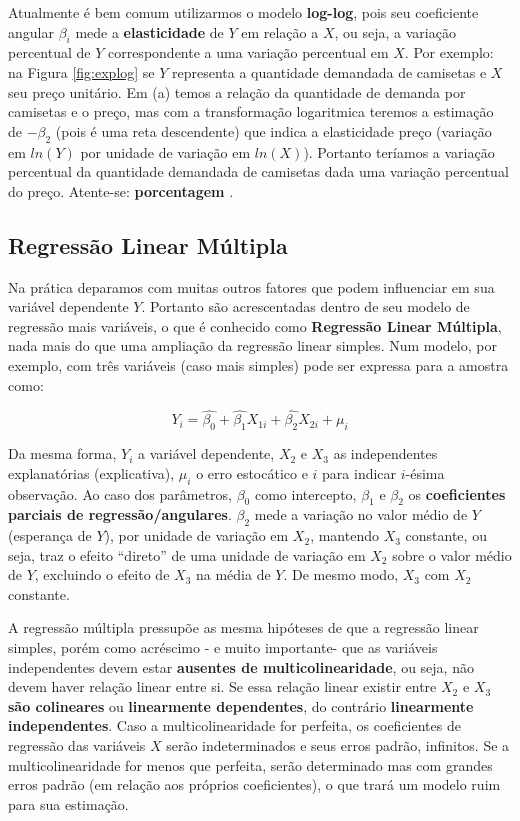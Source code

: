 \documentclass[
]{book}
\begin{document}
Atualmente é bem comum utilizarmos o modelo \textbf{log-log}, pois seu coeficiente angular \(\beta_i\) mede a \textbf{elasticidade} de \(Y\) em relação a \(X\), ou seja, a variação percentual de \(Y\) correspondente a uma variação percentual em \(X\). Por exemplo: na Figura \ref{fig:explog} se \(Y\) representa a quantidade demandada de camisetas e \(X\) seu preço unitário. Em (a) temos a relação da quantidade de demanda por camisetas e o preço, mas com a transformação logaritmica teremos a estimação de \(-\beta_2\) (pois é uma reta descendente) que indica a elasticidade preço (variação em \(ln(Y)\) por unidade de variação em \(ln(X)\)). Portanto teríamos a variação percentual da quantidade demandada de camisetas dada uma variação percentual do preço. Atente-se: \textbf{porcentagem} \citep{gujarati2011econometria}.

\hypertarget{regmult}{%
\subsection{Regressão Linear Múltipla}\label{regmult}}

Na prática deparamos com muitas outros fatores que podem influenciar em sua variável dependente \(Y\). Portanto são acrescentadas dentro de seu modelo de regressão mais variáveis, o que é conhecido como \textbf{Regressão Linear Múltipla}, nada mais do que uma ampliação da regressão linear simples. Num modelo, por exemplo, com três variáveis (caso mais simples) pode ser expressa para a amostra como:

\begin{equation}
    Y_i=\hat{\beta_0}+\hat{\beta_{1}}X_{1i}+\hat{\beta_{2}}X_{2i}+\mu_i
    \label{eq:regmult}
\end{equation}

Da mesma forma, \(Y_i\) a variável dependente, \(X_{2}\) e \(X_{3}\) as independentes explanatórias (explicativa), \(\mu_i\) o erro estocático e \(i\) para indicar \(i\)-ésima observação. Ao caso dos parâmetros, \(\beta_0\) como intercepto, \(\beta_1\) e \(\beta_2\) os \textbf{coeficientes parciais de regressão/angulares}. \(\beta_2\) mede a variação no valor médio de \(Y\) (esperança de \(Y\)), por unidade de variação em \(X_2\), mantendo \(X_3\) constante, ou seja, traz o efeito ``direto'' de uma unidade de variação em \(X_2\) sobre o valor médio de \(Y\), excluindo o efeito de \(X_3\) na média de \(Y\). De mesmo modo, \(X_3\) com \(X_2\) constante.

A regressão múltipla pressupõe as mesma hipóteses de que a regressão linear simples, porém como acréscimo - e muito importante- que as variáveis independentes devem estar \textbf{ausentes de multicolinearidade}, ou seja, não devem haver relação linear entre si. Se essa relação linear existir entre \(X_2\) e \(X_3\) \textbf{são colineares} ou \textbf{linearmente dependentes}, do contrário \textbf{linearmente independentes}. Caso a multicolinearidade for perfeita, os coeficientes de regressão das variáveis \(X\) serão indeterminados e seus erros padrão, infinitos. Se a multicolinearidade for menos que perfeita, serão determinado mas com grandes erros padrão (em relação aos próprios
coeficientes), o que trará um modelo ruim para sua estimação.
\end{document}
